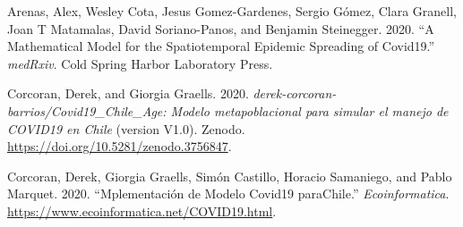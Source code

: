 \documentclass[]{article}
\begin{document}
\hypertarget{refs}{}
\leavevmode\hypertarget{ref-arenas2020mathematical}{}%
Arenas, Alex, Wesley Cota, Jesus Gomez-Gardenes, Sergio Gómez, Clara Granell, Joan T Matamalas, David Soriano-Panos, and Benjamin Steinegger. 2020. ``A Mathematical Model for the Spatiotemporal Epidemic Spreading of Covid19.'' \emph{medRxiv}. Cold Spring Harbor Laboratory Press.

\leavevmode\hypertarget{ref-derek_corcoran_barrios_2020_3756847}{}%
Corcoran, Derek, and Giorgia Graells. 2020. \emph{derek-corcoran-barrios/Covid19\_Chile\_Age: Modelo metapoblacional para simular el manejo de COVID19 en Chile} (version V1.0). Zenodo. \url{https://doi.org/10.5281/zenodo.3756847}.

\leavevmode\hypertarget{ref-corcoran_graells_2020}{}%
Corcoran, Derek, Giorgia Graells, Simón Castillo, Horacio Samaniego, and Pablo Marquet. 2020. ``Mplementación de Modelo Covid19 paraChile.'' \emph{Ecoinformatica}. \url{https://www.ecoinformatica.net/COVID19.html}.
\end{document}
